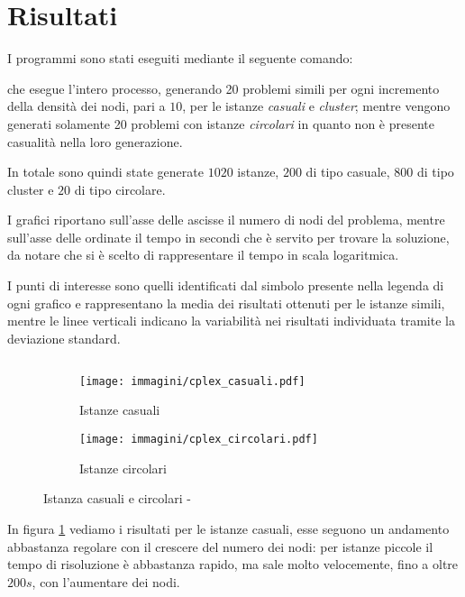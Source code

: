 \section{Risultati}
\label{sec:risultati}
I programmi sono stati eseguiti mediante il seguente comando:
\begin{quotation}
\end{quotation}
che esegue l'intero processo, generando 20 problemi simili per ogni incremento della densità dei nodi, pari a $10$, per le istanze \emph{casuali} e \emph{cluster}; mentre vengono generati solamente 20 problemi con istanze \emph{circolari} in quanto non è presente casualità nella loro generazione.

In totale sono quindi state generate $1020$ istanze, $200$ di tipo casuale, $800$ di tipo cluster e $20$ di tipo circolare.

I grafici riportano sull'asse delle ascisse il numero di nodi del problema, mentre sull'asse delle ordinate il tempo in secondi che è servito per trovare la soluzione, da notare che si è scelto di rappresentare il tempo in scala logaritmica.

I punti di interesse sono quelli identificati dal simbolo presente nella legenda di ogni grafico e rappresentano la media dei risultati ottenuti per le istanze simili, mentre le linee verticali indicano la variabilità nei risultati individuata tramite la deviazione standard.

\subsection{}

\begin{figure}[htb]
	\centering
	\begin{subfigure}[b]{.45\textwidth}
		\texttt{[image: immagini/cplex\_casuali.pdf]}
		\caption{Istanze casuali}
		\label{fig:casuali cplex}
	\end{subfigure}
	\quad
	\begin{subfigure}[b]{.45\textwidth}
		\texttt{[image: immagini/cplex\_circolari.pdf]}
		\caption{Istanze circolari}
		\label{fig:circolari cplex}
	\end{subfigure}
	\caption{Istanza casuali e circolari - }
	\label{fig:casuali circolari cplex}
\end{figure}

In figura \ref{fig:casuali cplex} vediamo i risultati per le istanze casuali, esse seguono un andamento abbastanza regolare con il crescere del numero dei nodi: per istanze piccole il tempo di risoluzione è abbastanza rapido, ma sale molto velocemente, fino a oltre $200s$, con l'aumentare dei nodi.

